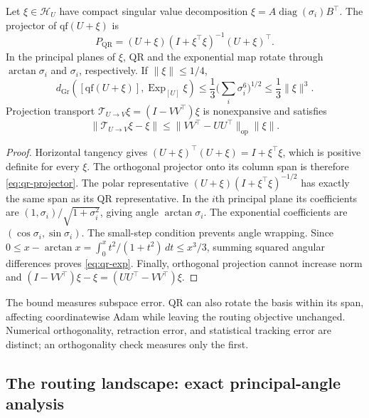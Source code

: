 \begin{lemma}
\label{lem:qr}
Let $\xi\in\mathcal H_U$ have compact singular value decomposition
$\xi=A\operatorname{diag}(\sigma_i)B^\top$. The projector of
$\mathrm{qf}(U+\xi)$ is
\begin{equation}
 P_{\mathrm{QR}}=(U+\xi)(I+\xi^\top\xi)^{-1}(U+\xi)^\top.
 \label{eq:qr-projector}
\end{equation}
In the principal planes of $\xi$, QR and the exponential map rotate through
$\arctan\sigma_i$ and $\sigma_i$, respectively. If $\|\xi\|\le1/4$,
\begin{equation}
 d_{\mathrm{Gr}}([\mathrm{qf}(U+\xi)],\operatorname{Exp}_{[U]}\xi)
 \le\frac13\Big(\sum_i\sigma_i^6\Big)^{1/2}
 \le\frac13\|\xi\|^3.\label{eq:qr-exp}
\end{equation}
Projection transport $\mathcal T_{U\to V}\xi=(I-VV^\top)\xi$ is
nonexpansive and satisfies
\begin{equation}
 \|\mathcal T_{U\to V}\xi-\xi\|
 \le\|VV^\top-UU^\top\|_{\mathrm{op}}\|\xi\|.
\end{equation}
\end{lemma}
\begin{proof}
Horizontal tangency gives $(U+\xi)^\top(U+\xi)=I+\xi^\top\xi$,
which is positive definite for every $\xi$. The orthogonal projector onto its
column span is therefore \eqref{eq:qr-projector}. The polar representative
$(U+\xi)(I+\xi^\top\xi)^{-1/2}$ has exactly the same span as its QR
representative. In the $i$th principal plane its coefficients are
$(1,\sigma_i)/\sqrt{1+\sigma_i^2}$, giving angle
$\arctan\sigma_i$. The exponential coefficients are
$(\cos\sigma_i,\sin\sigma_i)$. The small-step condition prevents angle
wrapping. Since
$0\le x-\arctan x=\int_0^x t^2/(1+t^2)\,dt\le x^3/3$,
summing squared angular differences proves \eqref{eq:qr-exp}.
Finally, orthogonal projection cannot increase norm and
$(I-VV^\top)\xi-\xi=(UU^\top-VV^\top)\xi$.
\end{proof}

The bound measures subspace error. QR can also rotate the basis within its
span, affecting coordinatewise Adam while leaving the routing objective
unchanged. Numerical orthogonality, retraction error, and statistical
tracking error are distinct; an orthogonality check measures only the first.

\subsection{The routing landscape: exact principal-angle analysis}
\label{app:landscape}

